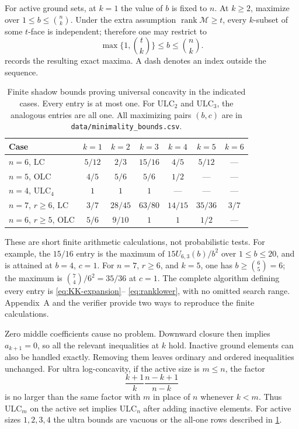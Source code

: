 \documentclass[11pt,letterpaper]{article}
\numberwithin{equation}{section}
\theoremstyle{definition}
\theoremstyle{remark}
\newcommand{\M}{\mathcal M}
\newcommand{\LC}{\mathrm{LC}}
\newcommand{\OLC}{\mathrm{OLC}}
\newcommand{\ULC}{\mathrm{ULC}}
\newcommand{\rank}{\operatorname{rank}}
\begin{document}
For active ground sets, at $k=1$ the value of $b$ is fixed to $n$.
At $k\ge2$, maximize over $1\le b\le\binom nk$. Under the extra assumption
$\rank\M\ge t$, every $k$-subset of some $t$-face is independent; therefore
one may restrict to
\begin{equation}\label{eq:ranklower}
 \max\{1,\binom tk\}\le b\le\binom nk.
\end{equation}
 records the resulting exact maxima. A dash denotes an
index outside the sequence.

\begin{table}[ht]
\centering\small
\setlength{\tabcolsep}{4.4pt}
\begin{tabular}{@{}l c c c c c c@{}}
\toprule
Case & $k=1$ & $k=2$ & $k=3$ & $k=4$ & $k=5$ & $k=6$\\
\midrule
$n=6$, $\LC$ & $5/12$ & $2/3$ & $15/16$ & $4/5$ & $5/12$ & ---\\
$n=5$, $\OLC$ & $4/5$ & $5/6$ & $5/6$ & $1/2$ & --- & ---\\
$n=4$, $\ULC_4$ & $1$ & $1$ & $1$ & --- & --- & ---\\
$n=7$, $r\ge6$, $\LC$ & $3/7$ & $28/45$ & $63/80$ & $14/15$ & $35/36$ & $3/7$\\
$n=6$, $r\ge5$, $\OLC$ & $5/6$ & $9/10$ & $1$ & $1$ & $1/2$ & ---\\
\bottomrule
\end{tabular}
\caption{Finite shadow bounds proving universal concavity in the indicated
cases. Every entry is at most one. For $\ULC_2$ and $\ULC_3$, the analogous
entries are all one. All maximizing pairs $(b,c)$ are in
\texttt{data/minimality\_bounds.csv}.}
\label{tab:bounds}
\end{table}

These are short finite arithmetic calculations, not probabilistic tests.
For example, the $15/16$ entry is the maximum of
$15U_{6,3}(b)/b^2$ over $1\le b\le20$, and is attained at $b=4$, $c=1$.
For $n=7$, $r\ge6$, and $k=5$, one has $b\ge\binom65=6$;
the maximum is $\binom74/6^2=35/36$ at $c=1$.
The complete algorithm defining every entry is \eqref{eq:KK-expansion}--
\eqref{eq:ranklower}, with no omitted search range. Appendix~A and the
verifier provide two ways to reproduce the finite calculations.

Zero middle coefficients cause no problem. Downward closure then implies
$a_{k+1}=0$, so all the relevant inequalities at $k$ hold.
Inactive ground elements can also be handled exactly. Removing them leaves
ordinary and ordered inequalities unchanged. For ultra log-concavity,
if the active size is $m\le n$, the factor
\[
 \frac{k+1}{k}\frac{n-k+1}{n-k}
\]
is no larger than the same factor with $m$ in place of $n$ whenever
$k<m$. Thus $\ULC_m$ on the active set implies $\ULC_n$ after adding
inactive elements. For active sizes $1,2,3,4$ the ultra bounds are vacuous
or the all-one rows described in \cref{tab:bounds}.
\end{document}
